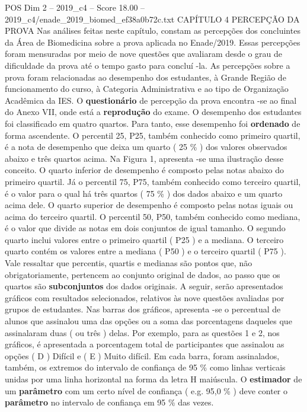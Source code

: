 \begin{textsample}{POS Dim 2 – 2019\_c4 – Score 18.00 – 2019\_c4/enade\_2019\_biomed\_ef38a0b72c.txt}  \label{ex:f2_pos_041}
CAPÍTULO 4 PERCEPÇÃO DA PROVA Nas análises feitas neste capítulo, constam as percepções dos concluintes da Área de Biomedicina sobre a prova aplicada no Enade/2019.
Essas percepções foram mensuradas por meio de nove questões que avaliaram desde o grau de dificuldade da prova até o tempo gasto para concluí -la.
As percepções sobre a prova foram relacionadas ao desempenho dos estudantes, à Grande Região de funcionamento do curso, à Categoria Administrativa e ao tipo de Organização Acadêmica da IES.
O \textbf{questionário} de percepção da prova encontra -se ao final do Anexo VII, onde está a \textbf{reprodução} do exame.
O desempenho dos estudantes foi classificado em quatro quartos.
Para tanto, esse desempenho foi \textbf{ordenado} de forma ascendente.
O percentil 25, P25, também conhecido como primeiro quartil, é a nota de desempenho que deixa um quarto ( 25 \% ) dos valores observados abaixo e três quartos acima.
Na Figura 1, apresenta -se uma ilustração desse conceito.
O quarto inferior de desempenho é composto pelas notas abaixo do primeiro quartil.
Já o percentil 75, P75, também conhecido como terceiro quartil, é o valor para o qual há três quartos ( 75 \% ) dos dados abaixo e um quarto acima dele.
O quarto superior de desempenho é composto pelas notas iguais ou acima do terceiro quartil.
O percentil 50, P50, também conhecido como mediana, é o valor que divide as notas em dois conjuntos de igual tamanho.
O segundo quarto inclui valores entre o primeiro quartil ( P25 ) e a mediana.
O terceiro quarto contém os valores entre a mediana ( P50 ) e o terceiro quartil ( P75 ).
Vale ressaltar que percentis, quartis e medianas são pontos que, não obrigatoriamente, pertencem ao conjunto original de dados, ao passo que os quartos são \textbf{subconjuntos} dos dados originais.
A seguir, serão apresentados gráficos com resultados selecionados, relativos às nove questões avaliadas por grupos de estudantes.
Nas barras dos gráficos, apresenta -se o percentual de alunos que assinalou uma das opções ou a soma das porcentagens daqueles que assinalaram duas ( ou três ) delas.
Por exemplo, para as questões 1 e 2, nos gráficos, é apresentada a porcentagem total de participantes que assinalou as opções ( D ) Difícil e ( E ) Muito difícil.
Em cada barra, foram assinalados, também, os extremos do intervalo de confiança de 95 \% como linhas verticais unidas por uma linha horizontal na forma da letra H maiúscula.
O \textbf{estimador} de um \textbf{parâmetro} com um certo nível de confiança ( e.g. 95,0 \% ) deve conter o \textbf{parâmetro} no intervalo de confiança em 95 \% das vezes.

\end{textsample}
